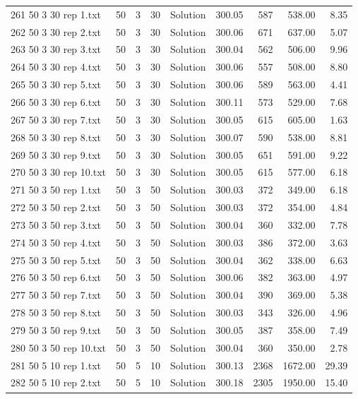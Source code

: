 \begin{longtable}{lrrllrrrr}
261 50 3 30 rep 1.txt & 50 & 3 & 30 & Solution & 300.05 & 587 & 538.00 &  8.35\\
262 50 3 30 rep 2.txt & 50 & 3 & 30 & Solution & 300.06 & 671 & 637.00 &  5.07\\
263 50 3 30 rep 3.txt & 50 & 3 & 30 & Solution & 300.04 & 562 & 506.00 &  9.96\\
264 50 3 30 rep 4.txt & 50 & 3 & 30 & Solution & 300.06 & 557 & 508.00 &  8.80\\
265 50 3 30 rep 5.txt & 50 & 3 & 30 & Solution & 300.06 & 589 & 563.00 &  4.41\\
266 50 3 30 rep 6.txt & 50 & 3 & 30 & Solution & 300.11 & 573 & 529.00 &  7.68\\
267 50 3 30 rep 7.txt & 50 & 3 & 30 & Solution & 300.05 & 615 & 605.00 &  1.63\\
268 50 3 30 rep 8.txt & 50 & 3 & 30 & Solution & 300.07 & 590 & 538.00 &  8.81\\
269 50 3 30 rep 9.txt & 50 & 3 & 30 & Solution & 300.05 & 651 & 591.00 &  9.22\\
270 50 3 30 rep 10.txt & 50 & 3 & 30 & Solution & 300.05 & 615 & 577.00 &  6.18\\
271 50 3 50 rep 1.txt & 50 & 3 & 50 & Solution & 300.03 & 372 & 349.00 &  6.18\\
272 50 3 50 rep 2.txt & 50 & 3 & 50 & Solution & 300.03 & 372 & 354.00 &  4.84\\
273 50 3 50 rep 3.txt & 50 & 3 & 50 & Solution & 300.04 & 360 & 332.00 &  7.78\\
274 50 3 50 rep 4.txt & 50 & 3 & 50 & Solution & 300.03 & 386 & 372.00 &  3.63\\
275 50 3 50 rep 5.txt & 50 & 3 & 50 & Solution & 300.04 & 362 & 338.00 &  6.63\\
276 50 3 50 rep 6.txt & 50 & 3 & 50 & Solution & 300.06 & 382 & 363.00 &  4.97\\
277 50 3 50 rep 7.txt & 50 & 3 & 50 & Solution & 300.04 & 390 & 369.00 &  5.38\\
278 50 3 50 rep 8.txt & 50 & 3 & 50 & Solution & 300.03 & 343 & 326.00 &  4.96\\
279 50 3 50 rep 9.txt & 50 & 3 & 50 & Solution & 300.05 & 387 & 358.00 &  7.49\\
280 50 3 50 rep 10.txt & 50 & 3 & 50 & Solution & 300.04 & 360 & 350.00 &  2.78\\
281 50 5 10 rep 1.txt & 50 & 5 & 10 & Solution & 300.13 & 2368 & 1672.00 & 29.39\\
282 50 5 10 rep 2.txt & 50 & 5 & 10 & Solution & 300.18 & 2305 & 1950.00 & 15.40\\

\end{longtable}
